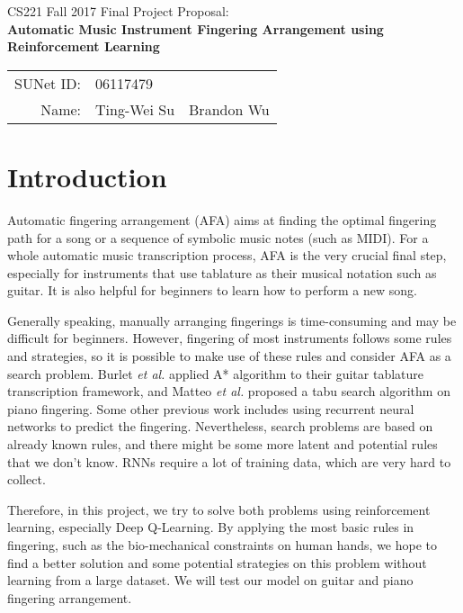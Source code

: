 \documentclass[12pt]{article}
\begin{document}
\begin{center}
{\Large CS221 Fall 2017 Final Project Proposal: \\}
{\Large \textbf{Automatic Music Instrument Fingering Arrangement using Reinforcement Learning}}

\begin{tabular}{rll}
SUNet ID: & 06117479 &  \\
Name: & Ting-Wei Su & Brandon Wu \\
\end{tabular}
\end{center}

\section*{Introduction}

Automatic fingering arrangement (AFA) aims at finding the optimal fingering path for a song or a sequence of symbolic music notes (such as MIDI). 
For a whole automatic music transcription process, AFA is the very crucial final step, especially for instruments that use tablature as their musical notation such as guitar. It is also helpful for beginners to learn how to perform a new song. 

Generally speaking, manually arranging fingerings is time-consuming and may be difficult for beginners. 
However, fingering of most instruments follows some rules and strategies, so it is possible to make use of these rules and consider AFA as a search problem. Burlet \textit{et al.} applied A* algorithm to their guitar tablature transcription framework, and Matteo \textit{et al.} proposed a tabu search algorithm on piano fingering. 
Some other previous work includes using recurrent neural networks to predict the fingering. 
Nevertheless, search problems are based on already known rules, and there might be some more latent and potential rules that we don't know. RNNs require a lot of training data, which are very hard to collect. 

Therefore, in this project, we try to solve both problems using reinforcement learning, especially Deep Q-Learning. By applying the most basic rules in fingering, such as the bio-mechanical constraints on human hands, we hope to find a better solution and some potential strategies on this problem without learning from a large dataset. We will test our model on guitar and piano fingering arrangement.
\end{document}
